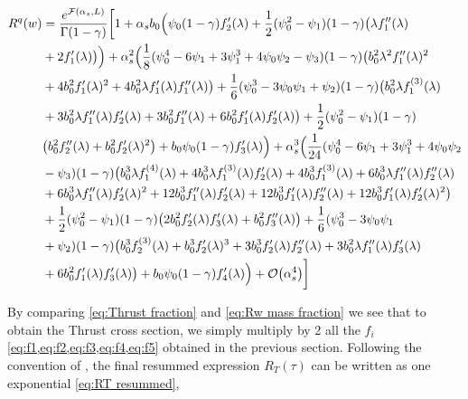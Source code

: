 \documentclass[../main.tex]{subfiles}
\begin{document}
\begin{align}
    \begin{split}\label{eq:Rw final expansion}
        R^q(w) &= \frac{e^{\mathcal{F}(\alpha_s,L)}}{\Gamma(1-\gamma)} \biggl[ 1 + \alpha_s b_0 \Bigl( \psi_0(1-\gamma) f_2'(\lambda )  + \frac{1}{2} (\psi_0^2-\psi_1)(1-\gamma)\bigl( \lambda  f_1''(\lambda ) \\
        &+2  f_1'(\lambda )\bigr)\Bigr) + \alpha_s^2 \Bigl(\frac{1}{8} (\psi_0^4 -6 \psi_1 + 3\psi_1^3 +4\psi_0\psi_2 -\psi_3)(1-\gamma) \bigl(b_0^2 \lambda ^2 f_1''(\lambda )^2\\
        &+4 b_0^2 f_1'(\lambda )^2 +4 b_0^2 \lambda  f_1'(\lambda ) f_1''(\lambda )\bigr)+\frac{1}{6} (\psi_0^3 -3 \psi_0\psi_1+\psi_2)(1-\gamma) \bigl(b_0^2 \lambda  f_1^{(3)}(\lambda )\\
        &+ 3 b_0^2 \lambda  f_1''(\lambda ) f_2'(\lambda )+3 b_0^2 f_1''(\lambda )+6 b_0^2 f_1'(\lambda ) f_2'(\lambda )\bigr)+\frac{1}{2} (\psi_0^2-\psi_1)(1-\gamma) \\
        &\bigl(b_0^2 f_2''(\lambda ) +b_0^2 f_2'(\lambda )^2\bigr) + b_0 \psi_0(1-\gamma) f_3'(\lambda )\Bigr) + \alpha_s^3 \Bigl(\frac{1}{24} (\psi_0^4 -6 \psi_1 + 3\psi_1^3 +4\psi_0\psi_2 \\
        &-\psi_3)(1-\gamma) \bigl(b_0^3 \lambda  f_1^{(4)}(\lambda ) +4 b_0^3 \lambda  f_1^{(3)}(\lambda ) f_2'(\lambda ) + 4 b_0^3 f_1^{(3)}(\lambda )+6 b_0^3 \lambda  f_1''(\lambda ) f_2''(\lambda ) \\
        &+ 6 b_0^3 \lambda  f_1''(\lambda ) f_2'(\lambda )^2 +12 b_0^3 f_1''(\lambda ) f_2'(\lambda )+12 b_0^3 f_1'(\lambda ) f_2''(\lambda ) + 12 b_0^3 f_1'(\lambda ) f_2'(\lambda )^2\bigr) \\
        &+ \frac{1}{2} (\psi_0^2-\psi_1)(1-\gamma) \bigl(2 b_0^2 f_2'(\lambda ) f_3'(\lambda )+b_0^2 f_3''(\lambda )\bigr) + \frac{1}{6} (\psi_0^3 -3 \psi_0\psi_1\\
        &+\psi_2)(1-\gamma) \bigl(b_0^3 f_2^{(3)}(\lambda )+b_0^3 f_2'(\lambda )^3 +3 b_0^3 f_2'(\lambda ) f_2''(\lambda )+3 b_0^2 \lambda  f_1''(\lambda ) f_3'(\lambda ) \\
        &+6 b_0^2 f_1'(\lambda ) f_3'(\lambda )\bigr) + b_0 \psi_0(1-\gamma) f_4'(\lambda ) \Bigr) + \order{\alpha_s^4} \biggr]
    \end{split}
\end{align}

By comparing \cref{eq:Thrust fraction} and \cref{eq:Rw mass fraction} we see that to obtain the Thrust cross section, we simply multiply by 2 all the $f_i$  \cref{eq:f1,eq:f2,eq:f3,eq:f4,eq:f5} 
obtained in the previous section. Following the convention of \cite{CATANI19933}, the final resummed expression $R_T(\tau)$ can be written as one exponential \cref{eq:RT resummed}, 
\end{document}
